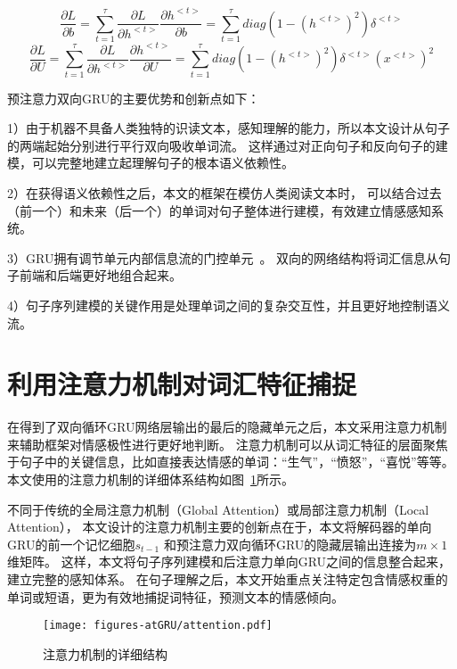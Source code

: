 \begin{equation}
\frac{\partial L}{\partial b}=\sum_{t=1}^{\tau }\frac{\partial L}{\partial h^{<t>}}\frac{\partial h^{<t>}}{\partial b}=\sum_{t=1}^{\tau }diag\left ( 1-\left ( h^{<t>} \right )^{2} \right )\delta^{<t>}
\end{equation}
\begin{equation}
\frac{\partial L}{\partial U}=\sum_{t=1}^{\tau }\frac{\partial L}{\partial h^{<t>}}\frac{\partial h^{<t>}}{\partial U}=\sum_{t=1}^{\tau }diag\left ( 1-\left ( h^{<t>} \right )^{2} \right )\delta^{<t>}\left (x^{<t>} \right )^{2}
\end{equation}

预注意力双向GRU的主要优势和创新点如下：

1）由于机器不具备人类独特的识读文本，感知理解的能力，所以本文设计从句子的两端起始分别进行平行双向吸收单词流。
	这样通过对正向句子和反向句子的建模，可以完整地建立起理解句子的根本语义依赖性。

2）在获得语义依赖性之后，本文的框架在模仿人类阅读文本时，
	可以结合过去（前一个）和未来（后一个）的单词对句子整体进行建模，有效建立情感感知系统。
	
3）GRU拥有调节单元内部信息流的门控单元~。
	双向的网络结构将词汇信息从句子前端和后端更好地组合起来。

4）句子序列建模的关键作用是处理单词之间的复杂交互性，并且更好地控制语义流。

\section{利用注意力机制对词汇特征捕捉}
在得到了双向循环GRU网络层输出的最后的隐藏单元之后，本文采用注意力机制来辅助框架对情感极性进行更好地判断。
注意力机制可以从词汇特征的层面聚焦于句子中的关键信息，比如直接表达情感的单词：“生气”，“愤怒”，“喜悦”等等。
本文使用的注意力机制的详细体系结构如图~\ref{fig:fig2}所示。

不同于传统的全局注意力机制（Global Attention）或局部注意力机制（Local Attention），
本文设计的注意力机制主要的创新点在于，本文将解码器的单向GRU的前一个记忆细胞${s_{t-1}}$
和预注意力双向循环GRU的隐藏层输出连接为${m\times1}$维矩阵。
这样，本文将句子序列建模和后注意力单向GRU之间的信息整合起来，建立完整的感知体系。
在句子理解之后，本文开始重点关注特定包含情感权重的单词或短语，更为有效地捕捉词特征，预测文本的情感倾向。

\begin{figure}[h!]
	\centering
	\texttt{[image: figures-atGRU/attention.pdf]}
	\caption{注意力机制的详细结构}
	\label{fig:fig2}
\end{figure}

